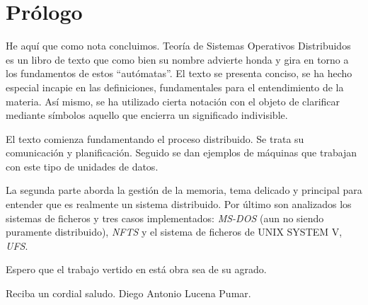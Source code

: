 \chapter{Pr\'ologo}
He aqu\'i que como nota concluimos. Teor\'ia de Sistemas Operativos Distribuidos
es un libro de texto que como bien su nombre advierte honda y gira en torno a
los fundamentos de estos ``aut\'omatas''. El texto se presenta conciso, se ha
hecho especial incapie en las definiciones, fundamentales para el entendimiento
de la materia. As\'i mismo, se ha utilizado cierta notaci\'on con el objeto de
clarificar mediante s\'imbolos aquello que encierra un significado indivisible.


El texto comienza fundamentando el proceso distribuido. Se trata su
comunicaci\'on y planificaci\'on. Seguido se dan ejemplos de m\'aquinas que
trabajan con este tipo de unidades de datos. 


La segunda parte aborda la gesti\'on de la memoria, tema delicado y principal
para entender que es realmente un sistema distribuido. Por \'ultimo son
analizados los sistemas de ficheros y tres casos implementados: \textit{MS-DOS}
(aun no siendo puramente distribuido), \textit{NFTS} y el sistema de ficheros de
UNIX SYSTEM V, \textit{UFS}.


Espero que el trabajo vertido en est\'a obra sea de su agrado.


Reciba un cordial saludo. Diego Antonio Lucena Pumar.